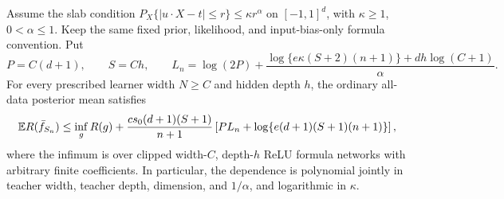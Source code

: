 \begin{theorem}
\label{thm:formula-continuous-oracle}
Assume the slab condition $P_X\{|u\cdot X-t|\le r\}\le\kappa r^\alpha$ on $[-1,1]^d$, with $\kappa\ge1$, $0<\alpha\le1$. Keep the same fixed prior, likelihood, and input-bias-only formula convention. Put
\[
 P=C(d+1),\qquad S=Ch,\qquad
 L_n=\log(2P)+\frac{\log\{e\kappa(S+2)(n+1)\}
                         +dh\log(C+1)}\alpha.
\]
For every prescribed learner width $N\ge C$ and hidden depth $h$, the ordinary all-data posterior mean satisfies
\[
 \mathbb E R(\bar f_{S_n})\le\inf_g R(g)
 +\frac{c s_0(d+1)(S+1)}{n+1}
       \left[P L_n+\log\{e(d+1)(S+1)(n+1)\}\right],
\]
where the infimum is over clipped width-$C$, depth-$h$ ReLU formula networks with arbitrary finite coefficients. In particular, the dependence is polynomial jointly in teacher width, teacher depth, dimension, and $1/\alpha$, and logarithmic in $\kappa$.
\end{theorem}
